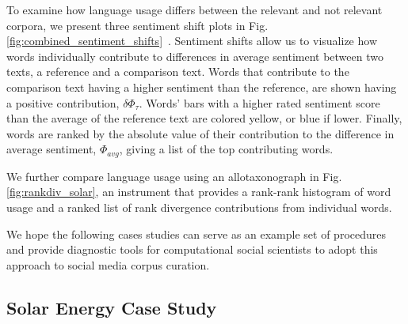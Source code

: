To examine how language usage differs between the relevant and not relevant corpora,
we present three sentiment shift plots in Fig. \ref{fig:combined_sentiment_shifts}~\cite{gallagher2021generalized}.
Sentiment shifts allow us to visualize how words individually contribute
to differences in average sentiment between two texts, a reference and a comparison text.
Words that contribute to the comparison text having a higher sentiment than the reference, are shown having a positive contribution, $\delta \Phi_{\tau}$. 
Words' bars with a higher rated sentiment score than the average of the reference text are colored yellow, or blue if lower. 
Finally, words are ranked by the absolute value of their contribution to the difference in average sentiment, $\Phi_{avg}$, giving a list of the top contributing words.



We further compare language usage using an allotaxonograph in Fig. \ref{fig:rankdiv_solar}, 
an instrument that provides a rank-rank histogram of word usage 
and a ranked list of rank divergence contributions from individual words. 



We hope the following cases studies can serve as an example set of procedures and provide diagnostic tools for computational social scientists to adopt this approach to social media corpus curation.





\subsection{Solar Energy Case Study}
\label{sec:corpusCreation.results.solar}



